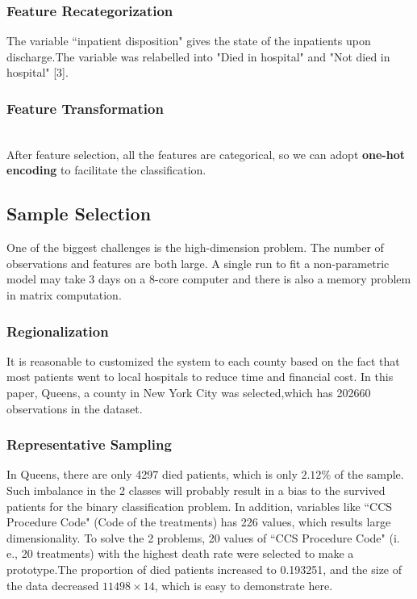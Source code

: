 \documentclass{article}
\begin{document}
\subsubsection{Feature Recategorization}

The variable ``inpatient disposition" gives the state of the inpatients upon discharge.The variable was relabelled into "Died in hospital" and "Not died in hospital" [3].\\

\subsubsection{Feature Transformation}\\
After feature selection, all the features are categorical, so we can adopt \textbf{one-hot encoding} to facilitate the classification.

\subsection{Sample Selection}
One of the biggest challenges is the high-dimension problem. The number of observations and features are both large. A single run to fit a non-parametric model may take 3 days on a 8-core computer and there is also a memory problem in matrix computation.\\

\subsubsection{Regionalization}
It is reasonable to customized the system to each county based on the fact that most patients went to local hospitals to reduce time and financial cost. In this paper, Queens, a county in New York City was selected,which has 202660 observations in the dataset.\\

\subsubsection{Representative Sampling}
In Queens, there are only 4297 died patients, which is only $2.12\%$ of the sample. Such imbalance in the 2 classes will probably result in a bias to the survived patients for the binary classification problem. In addition, variables like ``CCS Procedure Code" (Code of the treatments) has 226 values, which results large dimensionality. To solve the 2 problems, 20 values of ``CCS Procedure Code" (i. e., 20 treatments) with the highest death rate were selected to make a prototype.The proportion of died patients increased to 0.193251, and the size of the data decreased $11498\times 14$, which is easy to demonstrate here.
\end{document}
